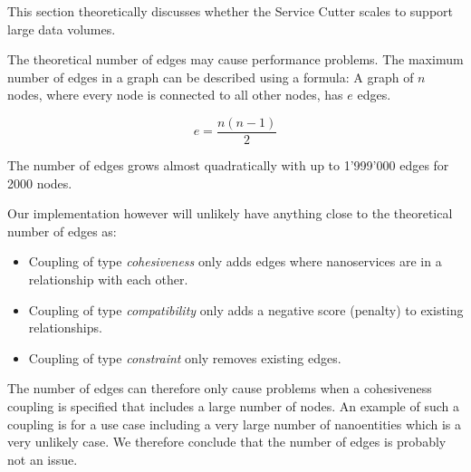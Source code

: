 This section theoretically discusses whether the Service Cutter scales to support large data volumes.

The theoretical number of edges may cause performance problems. The maximum number of edges in a graph can be described using a formula: A graph of $n$ nodes, where every node is connected to all other nodes, has $e$ edges.

\begin{displaymath}
e = \frac{n(n-1)}{2}
\end{displaymath}

The number of edges grows almost quadratically with up to 1'999'000 edges for 2000 nodes.

Our implementation however will unlikely have anything close to the theoretical number of edges as:
\begin{itemize}
	\item Coupling of type \textit{cohesiveness} only adds edges where nanoservices are in a relationship with each other.
	\item Coupling of type \textit{compatibility} only adds a negative score (penalty) to existing relationships.
	\item Coupling of type \textit{constraint} only removes existing edges.
\end{itemize}

The number of edges can therefore only cause problems when a cohesiveness coupling is specified that includes a large number of nodes. An example of such a coupling is for a use case including a very large number of nanoentities which is a very unlikely case. We therefore conclude that the number of edges is probably not an issue.

